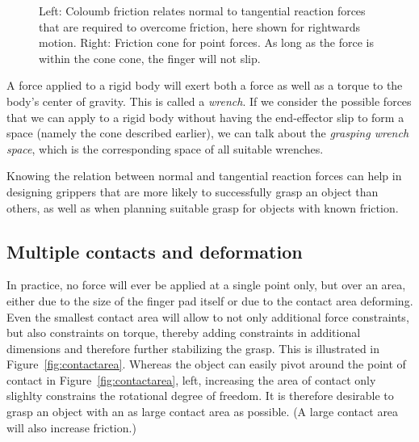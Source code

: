 \begin{figure}
\caption{Left: Coloumb friction relates normal to tangential reaction forces that are required to overcome friction, here shown for rightwards motion. Right: Friction cone for point forces. As long as the force is within the cone cone, the finger will not slip.}
\end{figure}

A force applied to a rigid body will exert both a force as well as a torque to the body's center of gravity. This is called a \emph{wrench}. If we consider the possible forces that we can apply to a rigid body without having the end-effector slip to form a space (namely the cone described earlier), we can talk about the \emph{grasping wrench space}, which is the corresponding space of all suitable wrenches.

Knowing the relation between normal and tangential reaction forces can help in designing grippers that are more likely to successfully grasp an object than others, as well as when planning suitable grasp for objects with known friction.


\subsection{Multiple contacts and deformation}
In practice, no force will ever be applied at a single point only, but over an area, either due to the size of the finger pad itself or due to the contact area deforming. Even the smallest contact area will allow to not only additional force constraints, but also constraints on torque, thereby adding constraints in additional dimensions and therefore further stabilizing the grasp. This is illustrated in Figure~\ref{fig:contactarea}. Whereas the object can easily pivot around the point of contact in Figure~\ref{fig:contactarea}, left, increasing the area of contact only slighlty constrains the rotational degree of freedom. It is therefore desirable to grasp an object with an as large contact area as possible. (A large contact area will also increase friction.)

